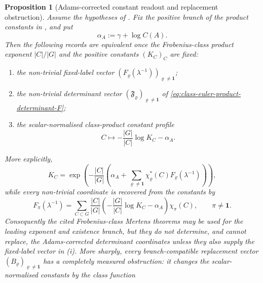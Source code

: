 \documentclass[11pt,a4paper]{amsart}
\theoremstyle{plain}
\newtheorem{proposition}[theorem]{Proposition}
\theoremstyle{definition}
\theoremstyle{remark}
\begin{document}
\begin{proposition}[Adams-corrected constant readout and replacement obstruction]
  \label{prop:classical-layer-adams-corrected-constant-separation}
  Assume the hypotheses of .  Fix the
  positive branch of the product constants in
  , and put
  \[
    \alpha_A:=\gamma+\log C(A).
  \]
  Then the following records are equivalent once the Frobenius-class product
  exponent \(|C|/|G|\) and the positive constants \((K_C)_C\) are fixed:
  \begin{enumerate}[label=\textup{(\roman*)},leftmargin=*]
    \item the non-trivial fixed-label vector
      \((F_\varrho(\lambda^{-1}))_{\varrho\neq\mathbf1}\);
    \item the non-trivial determinant vector
      \((\mathfrak F_\varrho)_{\varrho\neq\mathbf1}\) of
      \eqref{eq:class-euler-product-determinant-F};
    \item the scalar-normalised class-product constant profile
      \[
        C\longmapsto
        -\frac{|G|}{|C|}\log K_C-\alpha_A .
      \]
  \end{enumerate}
  More explicitly,
  \begin{equation}\label{eq:classical-layer-forward-calibration}
    K_C=
    \exp\!\left(
      -\frac{|C|}{|G|}
      \left(
        \alpha_A+
        \sum_{\varrho\neq\mathbf1}
          \chi_\varrho^\ast(C)F_\varrho(\lambda^{-1})
      \right)
    \right),
  \end{equation}
  while every non-trivial coordinate is recovered from the constants by
  \begin{equation}\label{eq:classical-layer-inverse-calibration}
    F_\pi(\lambda^{-1})
    =
    \sum_{C\subset G}
      \frac{|C|}{|G|}
      \left(
        -\frac{|G|}{|C|}\log K_C-\alpha_A
      \right)
      \chi_\pi(C),
    \qquad \pi\neq\mathbf1 .
  \end{equation}
  Consequently the cited Frobenius-class Mertens theorems may be used for the
  leading exponent and existence branch, but they do not determine, and cannot
  replace, the Adams-corrected determinant coordinates unless they also supply
  the fixed-label vector in \textup{(i)}.  More sharply, every
  branch-compatible replacement vector
  \((B_\varrho)_{\varrho\neq\mathbf1}\) has a completely measured obstruction:
  it changes the scalar-normalised constants by the class function
  \begin{equation}\label{eq:classical-layer-replacement-error}

\end{equation}
\end{proposition}
\end{document}
